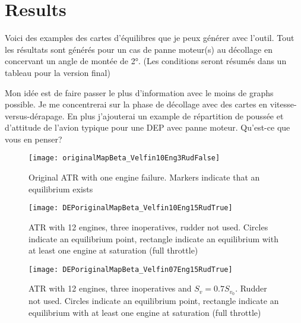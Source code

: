 \section{Results}

Voici des examples des cartes d'équilibres que je peux générer avec l'outil. Tout les résultats sont générés pour un cas de panne moteur(s) au décollage en concervant un angle de montée de 2°. (Les conditions seront résumés dans un tableau pour la version final)

Mon idée est de faire passer le plus d'information avec le moins de graphs possible. Je me concentrerai sur la phase de décollage avec des cartes en vitesse-versus-dérapage. En plus j'ajouterai un example de répartition de poussée et d'attitude de l'avion typique pour une DEP avec panne moteur. Qu'est-ce que vous en penser?

\begin{figure}[hbt!]
	\centering
		\texttt{[image: originalMapBeta\_Velfin10Eng3RudFalse]}
		\caption{Original ATR with one engine failure. Markers indicate that an equilibrium exists}
		\label{fig:originalfin1_3engine}
\end{figure}

\begin{figure}[hbt!]
		\centering
		\texttt{[image: DEPoriginalMapBeta\_Velfin10Eng15RudTrue]}
		\caption{ATR with 12 engines, three inoperatives, rudder not used. Circles indicate an equilibrium point, rectangle indicate an equilibrium with at least one engine at saturation (full throttle)}
		\label{fig:DEPoriginalfin1_15engine}
\end{figure}

\begin{figure}[hbt!]
	\centering
	\texttt{[image: DEPoriginalMapBeta\_Velfin07Eng15RudTrue]}
	\caption{ATR with 12 engines, three inoperatives and $S_v=0.7S_{v_0}$. Rudder not used. Circles indicate an equilibrium point, rectangle indicate an equilibrium with at least one engine at saturation (full throttle)}
	\label{fig:DEPoriginalfin07_15engine}
\end{figure}


